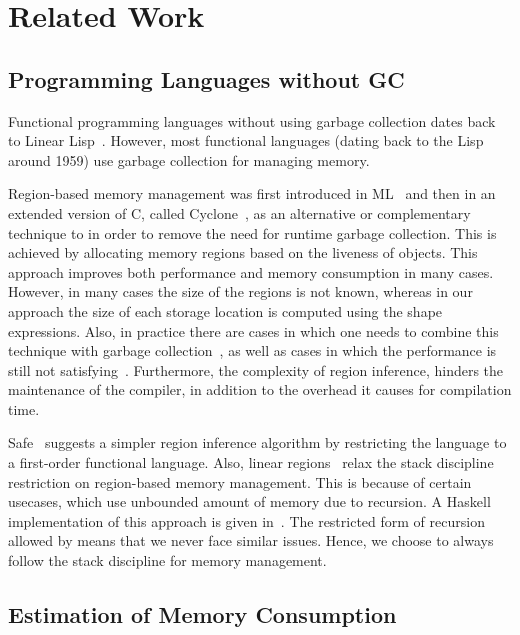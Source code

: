 \section{Related Work}
\label{sec:related}
\subsection{Programming Languages without GC}
Functional programming languages without using garbage collection dates back to Linear Lisp~\cite{baker1992lively}. However, most functional languages (dating back to
the Lisp around 1959) use garbage collection for managing memory.

Region-based memory management was first introduced in ML~\cite{TOFTE1997109} and then in an extended version of C, called Cyclone~\cite{Grossman:2002:RMM:512529.512563}, as an alternative or complementary technique to in order to remove the need for runtime garbage collection. This is achieved by allocating memory regions based on the liveness of objects. This approach improves both performance and memory consumption in many cases. However, in many cases the size of the regions is not known, whereas in our approach the size of each storage location is computed using the shape expressions. Also, in practice there are cases in which one needs to combine this technique with garbage collection~\cite{Hallenberg:2002:CRI:512529.512547}, as well as cases in which the performance is still not satisfying~\cite{Birkedal:1996:RIV:237721.237771, Tofte:2004:RRM:993034.993040}. Furthermore, the complexity of region inference, hinders the maintenance of the compiler, in addition to the overhead it causes for compilation time.

Safe~\cite{montenegro2009simple, montenegro2008type} suggests a simpler region inference algorithm by restricting the language to a first-order functional language. Also, linear regions~\cite{fluet2006linear} relax the stack discipline restriction on region-based memory management. This is because of certain usecases, which use unbounded amount of memory due to recursion. A Haskell implementation of this approach is given in~\cite{kiselyov2008lightweight}. The restricted form of recursion allowed by \lafsharp{} means that we never face similar issues. Hence, we choose to always follow the stack discipline for memory management.

\subsection{Estimation of Memory Consumption}

